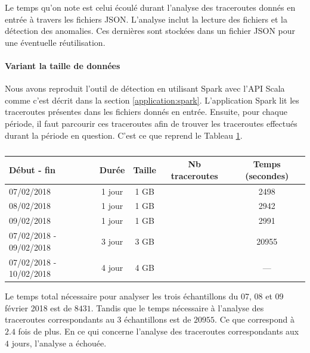   
Le temps qu'on note est celui écoulé durant l'analyse des traceroutes donnés en entrée à travers les fichiers JSON. L'analyse inclut la lecture des fichiers et la détection des anomalies. Ces dernières sont stockées dans un fichier JSON pour une éventuelle réutilisation.



 



\paragraph{Variant la taille de données}

Nous avons reproduit l'outil de détection en utilisant Spark avec l'API Scala comme c'est décrit dans la section \ref{application:spark}. L'application Spark lit les traceroutes présentes dans les fichiers donnés en entrée. Ensuite, pour chaque période, il faut parcourir ces traceroutes afin de trouver les traceroutes effectués durant la période en question. C'est ce que reprend le Tableau \ref{tab:spark-timing}. 

\begin{table}[H]
	\begin{tabular}{lcccc}
		\textbf{Début - fin} &\textbf{Durée}  & \textbf{Taille}  & \textbf{Nb traceroutes} & \textbf{Temps (secondes)} \\ \hline
		
		07/02/2018&1 jour&1 GB&& 2498\\ \hline
		08/02/2018&1 jour&1 GB&& 2942\\ \hline
		09/02/2018&1 jour& 1 GB&& 2991\\ \hline
		07/02/2018 - 09/02/2018&3 jour& 3 GB&& 20955\\ \hline
		07/02/2018 - 10/02/2018&4 jour& 4 GB& & --- \\ \hline
	\end{tabular}
	\caption{}
	\label{tab:spark-timing}
\end{table}

Le temps total nécessaire pour analyser les trois échantillons du 07, 08 et 09 février 2018 est de $ 8431 $. Tandis que le temps nécessaire à l'analyse des traceroutes correspondants au 3 échantillons est de $20955$. Ce que correspond à $ 2.4 $ fois de plus.
En ce qui concerne l'analyse des traceroutes correspondants aux $ 4 $ jours,  l'analyse a échouée. 

